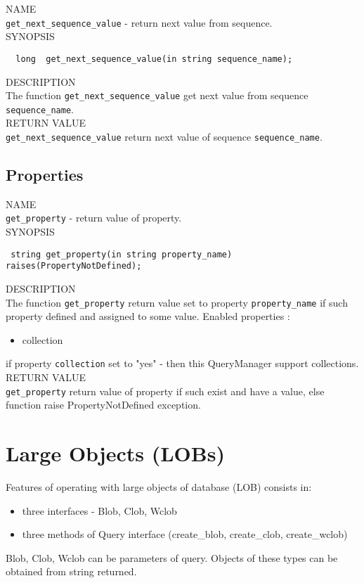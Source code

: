 \documentclass[10pt]{article}
\begin{document}
NAME \\ 
\verb|get_next_sequence_value| - return next value from sequence. \\

\noindent SYNOPSIS 
\begin{verbatim}
  long  get_next_sequence_value(in string sequence_name); 
\end{verbatim}
  
\noindent DESCRIPTION \\
The function \verb|get_next_sequence_value| get next value from  sequence \verb|sequence_name|. \\


\noindent RETURN VALUE \\
\verb|get_next_sequence_value| return next value of sequence \verb|sequence_name|. 
  
\subsection { Properties }
  
NAME \\
\verb|get_property| - return value of property. \\ 
  
\noindent SYNOPSIS 
\begin{verbatim}
 string get_property(in string property_name)   raises(PropertyNotDefined); 
\end{verbatim}
   
\noindent DESCRIPTION \\
The function \verb|get_property| return value set to property \verb|property_name| if such property defined and assigned to some value. 
Enabled properties : 
\begin{itemize}
 \item collection 
\end{itemize}
if property \verb|collection| set to "yes" - then this QueryManager support collections. \\
     
\noindent RETURN VALUE  \\
\verb|get_property|  return value of property if such exist and have a value, else function raise PropertyNotDefined exception. 


\section{ Large Objects (LOBs)  }

  Features of operating with large objects of database (LOB) consists in:
 \begin{itemize}
   \item three interfaces - Blob, Clob, Wclob
   \item three methods of Query interface (create\_blob, create\_clob, create\_wclob)
 \end{itemize}
  Blob, Clob, Wclob can be parameters of query. 
  Objects of these types can be obtained from string returned.
\end{document}
